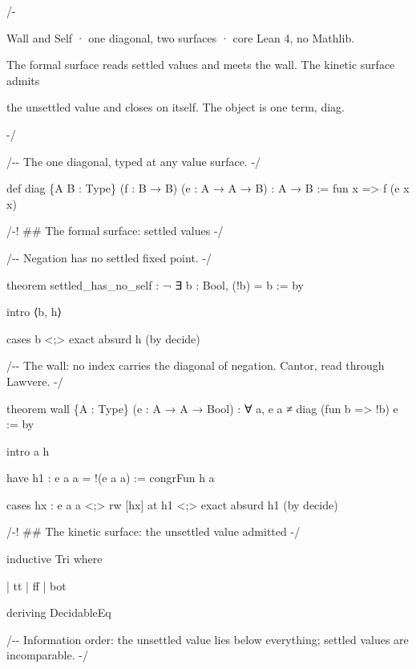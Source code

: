 \documentclass[10pt,twocolumn]{article}
\newenvironment{Shaded}{}{}
\newcommand{\NormalTok}[1]{#1}
\providecommand{\NormalTok}[1]{#1}
\providecommand{\NormalTok}[1]{#1}
\begin{document}
\begin{strip}
\begin{Shaded}
\begin{Highlighting}[]
\NormalTok{/{-}}

\NormalTok{  Wall and Self · one diagonal, two surfaces · core Lean 4, no Mathlib.}

\NormalTok{  The formal surface reads settled values and meets the wall. The kinetic surface admits}

\NormalTok{  the unsettled value and closes on itself. The object is one term, \textasciigrave{}diag\textasciigrave{}.}

\NormalTok{{-}/}

\NormalTok{/{-}{-} The one diagonal, typed at any value surface. {-}/}

\NormalTok{def diag \{A B : Type\} (f : B → B) (e : A → A → B) : A → B := fun x =\textgreater{} f (e x x)}

\NormalTok{/{-}! \#\# The formal surface: settled values {-}/}

\NormalTok{/{-}{-} Negation has no settled fixed point. {-}/}

\NormalTok{theorem settled\_has\_no\_self : ¬ ∃ b : Bool, (!b) = b := by}

\NormalTok{  intro ⟨b, h⟩}

\NormalTok{  cases b \textless{};\textgreater{} exact absurd h (by decide)}

\NormalTok{/{-}{-} The wall: no index carries the diagonal of negation. Cantor, read through Lawvere. {-}/}

\NormalTok{theorem wall \{A : Type\} (e : A → A → Bool) : ∀ a, e a ≠ diag (fun b =\textgreater{} !b) e := by}

\NormalTok{  intro a h}

\NormalTok{  have h1 : e a a = !(e a a) := congrFun h a}

\NormalTok{  cases hx : e a a \textless{};\textgreater{} rw [hx] at h1 \textless{};\textgreater{} exact absurd h1 (by decide)}

\NormalTok{/{-}! \#\# The kinetic surface: the unsettled value admitted {-}/}

\NormalTok{inductive Tri where}

\NormalTok{  | tt | ff | bot}

\NormalTok{deriving DecidableEq}

\NormalTok{/{-}{-} Information order: the unsettled value lies below everything; settled values are incomparable. {-}/}


\end{Highlighting}
\end{Shaded}
\end{strip}
\end{document}
